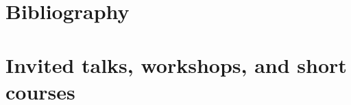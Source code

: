 \documentclass[letterpaper]{resume}
\begin{document}

\section{Bibliography}
\vspace{0.5em}

\nocite{*}




\section{Invited talks, workshops, and short courses}
\vspace{0.5em}
\end{document}
